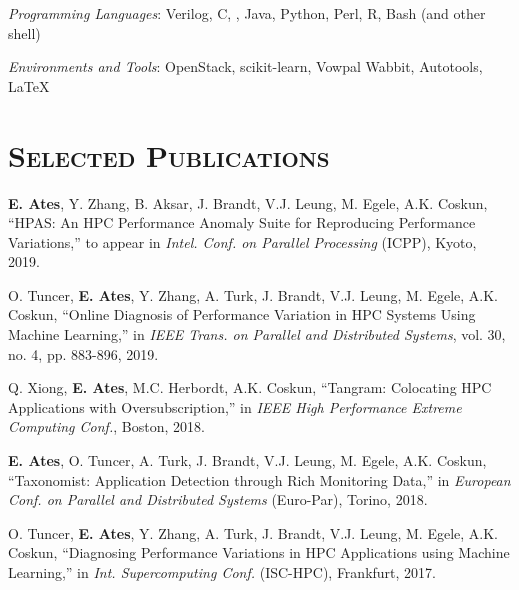 \begin{resume}
	\emph{Programming Languages}: Verilog, C, \Cplusplus, Java, Python, Perl, R,
  Bash (and other shell)
	\setlength{\parskip}{1mm}

	\emph{Environments and Tools}: OpenStack, scikit-learn, Vowpal Wabbit, Autotools, \LaTeX




  \section{\textsc{Selected Publications}}
  \textbf{E. Ates}, Y. Zhang, B. Aksar, J. Brandt, V.J. Leung, M.
  Egele, A.K. Coskun, ``HPAS: An HPC Performance Anomaly Suite for Reproducing
  Performance Variations,'' to appear in \textit{Intel. Conf. on Parallel
    Processing} (ICPP), Kyoto, 2019. 

  \vspace{0.1in}
  O. Tuncer, \textbf{E. Ates}, Y. Zhang, A. Turk, J. Brandt, V.J. Leung, M.
  Egele, A.K. Coskun, ``Online Diagnosis of Performance Variation in HPC Systems
  Using Machine Learning,'' in \textit{IEEE Trans. on Parallel and
    Distributed Systems}, vol. 30, no. 4, pp. 883-896, 2019.

  \vspace{0.1in}

  Q. Xiong, \textbf{E. Ates}, M.C. Herbordt, A.K. Coskun, ``Tangram: Colocating
  HPC Applications with Oversubscription,'' in \textit{IEEE High Performance
    Extreme Computing Conf.}, Boston, 2018.

  \vspace{0.1in}
  
  \textbf{E. Ates}, O. Tuncer, A. Turk, J. Brandt, V.J. Leung, M. Egele, A.K.
  Coskun, ``Taxonomist: Application Detection through Rich Monitoring Data,'' in
  \textit{European Conf. on Parallel and Distributed Systems} (Euro-Par),
  Torino, 2018. 

  \vspace{0.1in}
  
  O. Tuncer, \textbf{E. Ates}, Y. Zhang, A. Turk, J. Brandt, V.J. Leung, M.
  Egele, A.K. Coskun, ``Diagnosing Performance Variations in HPC Applications
  using Machine Learning,'' in \textit{Int. Supercomputing Conf.} (ISC-HPC),
  Frankfurt, 2017.


\end{resume}
